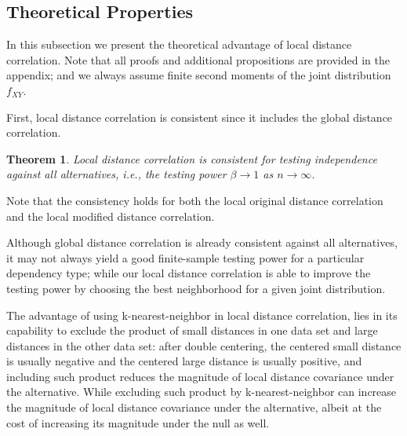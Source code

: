 \documentclass[12pt]{article}
\newtheorem{thm}{Theorem}
\begin{document}

\subsection{Theoretical Properties}
\label{main4}
In this subsection we present the theoretical advantage of local distance correlation. Note that all proofs and additional propositions are provided in the appendix; and we always assume finite second moments of the joint distribution $f_{XY}$.

First, local distance correlation is consistent since it includes the global distance correlation.
\begin{thm}
\label{thm1}
Local distance correlation is consistent for testing independence against all alternatives, i.e., the testing power $\beta \rightarrow 1$ as $n \rightarrow \infty$. 
\end{thm}
Note that the consistency holds for both the local original distance correlation and the local modified distance correlation.

Although global distance correlation is already consistent against all alternatives, it may not always yield a good finite-sample testing power for a particular dependency type; while our local distance correlation is able to improve the testing power by choosing the best neighborhood for a given joint distribution. 

The advantage of using k-nearest-neighbor in local distance correlation, lies in its capability to exclude the product of small distances in one data set and large distances in the other data set: after double centering, the centered small distance is usually negative and the centered large distance is usually positive, and including such product reduces the magnitude of local distance covariance under the alternative. While excluding such product by k-nearest-neighbor can increase the magnitude of local distance covariance under the alternative, albeit at the cost of increasing its magnitude under the null as well. 
\end{document}
